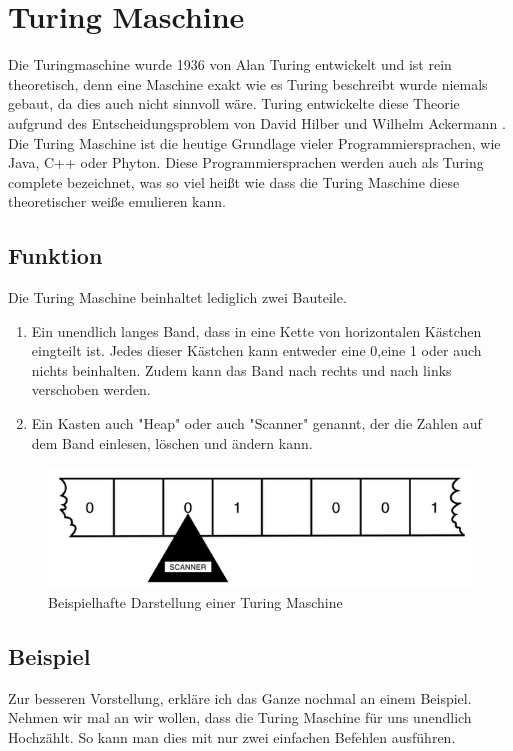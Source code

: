 \section{Turing Maschine}
Die Turingmaschine wurde 1936 von Alan Turing entwickelt und ist rein theoretisch, denn eine Maschine exakt wie es Turing beschreibt wurde niemals gebaut, da dies auch nicht sinnvoll wäre. Turing entwickelte diese Theorie aufgrund des Entscheidungsproblem von David Hilber und Wilhelm Ackermann \cite{theessentialturing}. Die Turing Maschine ist die heutige Grundlage vieler Programmiersprachen, wie Java, C++ oder Phyton. Diese Programmiersprachen werden auch als Turing complete bezeichnet, was so viel heißt wie dass die Turing Maschine diese theoretischer weiße emulieren kann.

\subsection{Funktion} 
Die Turing Maschine beinhaltet lediglich zwei Bauteile.
\begin{enumerate}
\item  Ein unendlich langes Band, dass in eine Kette von horizontalen Kästchen eingteilt ist. Jedes dieser Kästchen kann entweder eine 0,eine 1 oder auch nichts beinhalten. Zudem kann das Band nach rechts und nach links verschoben werden.
\item Ein Kasten auch "Heap" oder auch "Scanner" genannt, der die Zahlen auf dem Band einlesen, löschen und ändern kann.
\end{enumerate}
 
\begin{figure}[hbtp]
\centering
\includegraphics[scale=1]{TuringmashinePicture.png}
\caption{Beispielhafte Darstellung einer Turing Maschine\cite{theessentialturing}}
\end{figure}




\subsection{Beispiel} Zur besseren Vorstellung, erkläre ich das Ganze nochmal an einem Beispiel. Nehmen wir mal an wir wollen, dass die Turing Maschine für uns unendlich Hochzählt. So kann man dies mit nur zwei einfachen Befehlen ausführen. 

